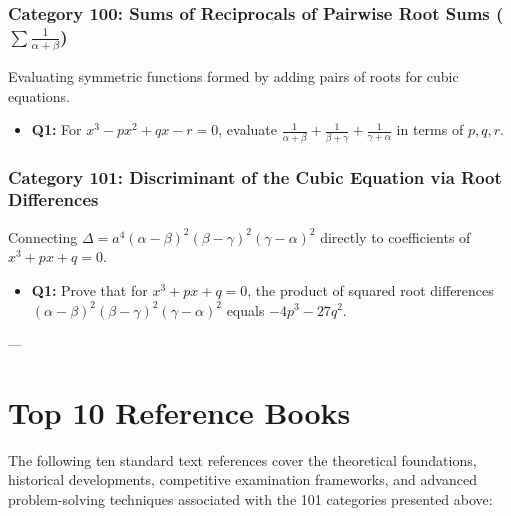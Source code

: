 \documentclass[10pt,a4paper]{article}
\begin{document}
\subsubsection{Category 100: Sums of Reciprocals of Pairwise Root Sums ($\sum \frac{1}{\alpha+\beta}$)}
Evaluating symmetric functions formed by adding pairs of roots for cubic equations.
\begin{itemize}[leftmargin=*]
    \item \textbf{Q1:} For $x^3 - px^2 + qx - r = 0$, evaluate $\frac{1}{\alpha+\beta} + \frac{1}{\beta+\gamma} + \frac{1}{\gamma+\alpha}$ in terms of $p, q, r$.
\end{itemize}

\subsubsection{Category 101: Discriminant of the Cubic Equation via Root Differences}
Connecting $\Delta = a^4 (\alpha-\beta)^2 (\beta-\gamma)^2 (\gamma-\alpha)^2$ directly to coefficients of $x^3 + px + q = 0$.
\begin{itemize}[leftmargin=*]
    \item \textbf{Q1:} Prove that for $x^3 + px + q = 0$, the product of squared root differences $(\alpha-\beta)^2(\beta-\gamma)^2(\gamma-\alpha)^2$ equals $-4p^3 - 27q^2$.
\end{itemize}

---

\section{Top 10 Reference Books}

The following ten standard text references cover the theoretical foundations, historical developments, competitive examination frameworks, and advanced problem-solving techniques associated with the 101 categories presented above:
\end{document}
